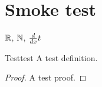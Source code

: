 \documentclass{article}
\begin{document}
\section{Smoke test}

\( \mathbb{R} \), \( \mathbb{N} \), \( \frac{d}{dx}{t} \)

\begin{definition}{Test}{test}
A test definition.
\end{definition}

\begin{proof}
A test proof.
\end{proof}
\end{document}
